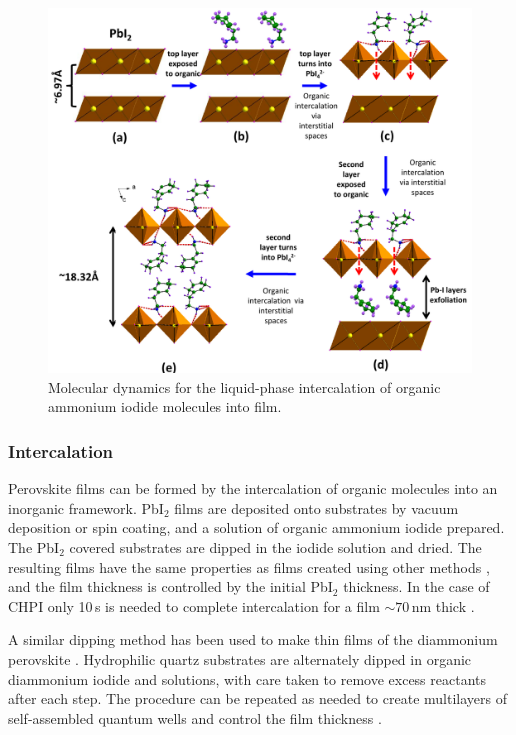 \begin{figure} [h!]
\centering
\includegraphics[width=\textwidth]{Fig7}
\caption{Molecular dynamics for the liquid-phase intercalation of organic ammonium iodide molecules into  film.}
\label{2Fig7}
\end{figure}
\subsubsection{Intercalation}
Perovskite films can be formed by the intercalation of organic molecules into an inorganic framework. Pb$\textrm{I}_2$ films are deposited onto substrates by vacuum deposition or spin coating, and a solution of organic ammonium iodide prepared. The Pb$\textrm{I}_2$ covered substrates are dipped in the iodide solution and dried. The resulting films have the same properties as films created using other methods \cite{Liang1998}, and the film thickness is controlled by the initial Pb$\textrm{I}_2$ thickness. In the case of CHPI only 10\,s is needed to complete intercalation for a film $\sim70$\,nm thick \cite{Pradeesh2009a}.

A similar dipping method has been used to make thin films of the diammonium perovskite \mbox{}. Hydrophilic quartz substrates are alternately dipped in organic diammonium iodide and  solutions, with care taken to remove excess reactants after each step. The procedure can be repeated as needed to create multilayers of self-assembled quantum wells and control the film thickness \cite{Matsui2002}.

